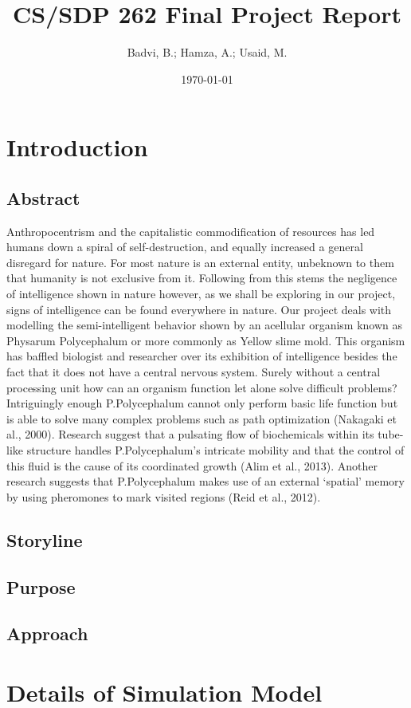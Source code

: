 \documentclass[a4paper, 10pt]{article}
\title{CS/SDP 262 Final Project Report}
\date{\today}
\author{Badvi, B.; Hamza, A.; Usaid, M.}
\begin{document}
\maketitle
\newpage
\tableofcontents
\newpage
\section {Introduction}
\subsection{Abstract}
Anthropocentrism and the capitalistic commodification of resources has led humans down a spiral of self-destruction, and equally increased a general disregard for nature. For most nature is an external entity, unbeknown to them that humanity is not exclusive from it. Following from this stems the negligence of intelligence shown in nature however, as we shall be exploring in our project, signs of intelligence can be found everywhere in nature. Our project deals with modelling the semi-intelligent behavior shown by an acellular organism known as Physarum Polycephalum or more commonly as Yellow slime mold. This organism has baffled biologist and researcher over its exhibition of intelligence besides the fact that it does not have a central nervous system. Surely without a central processing unit how can an organism function let alone solve difficult problems? Intriguingly enough P.Polycephalum cannot only perform basic life function but is able to solve many complex problems such as path optimization (Nakagaki et al., 2000). Research suggest that a pulsating flow of biochemicals within its tube-like structure handles P.Polycephalum’s intricate mobility and that the control of this fluid is the cause of its coordinated growth (Alim et al., 2013). Another research suggests that P.Polycephalum makes use of an external ‘spatial’ memory by using pheromones to mark visited regions (Reid et al., 2012).
\subsection{Storyline}
\subsection{Purpose}
\subsection{Approach}

\section {Details of Simulation Model}
\end{document}
